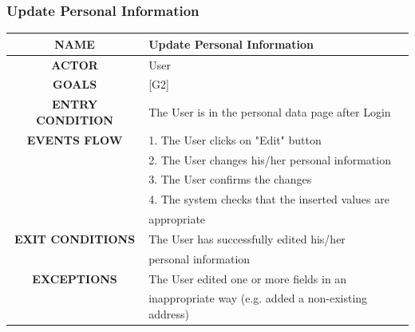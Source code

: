 \documentclass[12pt,a4paper]{article}
\begin{document}
		\subsubsection{Update Personal Information}
		\begin{center}
			\begin{tabular}{| c | l |}
				\hline
				\textbf{NAME} & Update Personal Information \\
				\hline
				\textbf{ACTOR} & User \\
				\hline
				\textbf{GOALS} & [G2] \\
				\hline
				\textbf{ENTRY CONDITION} & The User is in the personal data page after Login\\ \hline
				\textbf{EVENTS FLOW}  &
				1. The User clicks on "Edit" button\\
				&2. The User changes his/her personal information \\
				&3. The User confirms the changes\\
				&4. The system checks that the inserted values are\\
				& appropriate\\
				\hline
				\textbf{EXIT CONDITIONS}
				& The User has successfully edited his/her \\
				& personal information \\ \hline
				\textbf{EXCEPTIONS} &
				 The User edited one or more fields in an \\
				& inappropriate way (e.g. added a non-existing address)\\
				\hline
			\end{tabular}
		\end{center}
	
		\newpage
\end{document}
